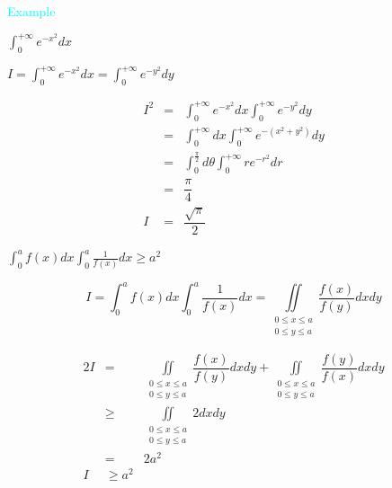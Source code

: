 \textcolor{cyan}{Example}
\begin{example}[][Exam: 8.3.1]
	$\displaystyle{\int_{0}^{+\infty}e^{-x^{2}}dx}$
\end{example}
\begin{anymark}[证明]
	$I = \int_{0}^{+\infty}e^{-x^{2}}dx = \int_{0}^{+\infty}e^{-y^{2}}dy$

	\begin{eqnarray*}
		I^{2} & = & \int_{0}^{+\infty}e^{-x^{2}}dx\int_{0}^{+\infty}e^{-y^{2}}dy\\
			  & = & \int_{0}^{+\infty}dx\int_{0}^{+\infty}e^{-(x^{2}+y^{2})}dy\\
			  & = & \int_{0}^{\frac{\pi}{2}}d \theta \int_{0}^{+\infty}re^{-r^{2}}dr\\
			  & = & \dfrac{\pi}{4} \\
		I	  & = & \dfrac{\sqrt{\pi}}{2}
	\end{eqnarray*}
\end{anymark}


\begin{example}[][Exam: 8.3.2]
	$\displaystyle{\int_{0}^{a}f(x)dx\int_{0}^{a}\frac{1}{f(x)}dx\geq a^{2}}$
\end{example} 
\begin{anymark}[证明]
	$$I = \int_{0}^{a}f(x)dx\int_{0}^{a}\dfrac{1}{f(x)}dx = \iint\limits_{\substack{0\leq x\leq a\\0\leq y\leq a}}\dfrac{f(x)}{f(y)}dxdy$$

	\begin{eqnarray*}
		2I    & = & \iint\limits_{\substack{0\leq x\leq a\\0\leq y\leq a}}\dfrac{f(x)}{f(y)}dxdy 
				+   \iint\limits_{\substack{0\leq x\leq a\\0\leq y\leq a}}\dfrac{f(y)}{f(x)}dxdy\\
			  & \geq & \iint\limits_{\substack{0\leq x\leq a\\0\leq y\leq a}} 2dxdy\\
			  &  =   & 2a^{2}\\
		 I	  & \geq a^{2}& 
	\end{eqnarray*}
\end{anymark}

